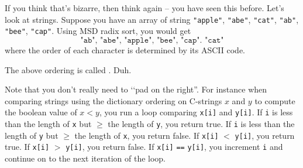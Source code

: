If you think that's bizarre, then think again -- you have
seen this before.
Let's look at strings.
Suppose you have an array of string
\verb!"apple"!,
\verb!"abe"!,
\verb!"cat"!,
\verb!"ab"!,
\verb!"bee"!,
\verb!"cap"!.
Using MSD radix sort, you would get
\[
\texttt{"ab",
"abe",
"apple",
"bee",
"cap".
"cat"}
\]
where the order of each character is determined by its ASCII code.

The above ordering is called . Duh.

Note that you  don't really need to \lq\lq pad on the right''.
For instance when comparing strings using the dictionary ordering
on C-strings $x$ and $y$ to compute the boolean value of
$x < y$,
you run a loop comparing \verb!x[i]! and \verb!y[i]!.
If \verb!i! is less than the length of \verb!x! but $\geq$ the length of
\verb!y!,
you return true.
If \verb!i! is less than the length of \verb!y! but $\geq$ the length of
\verb!x!,
you return false.
If \verb!x[i]! $<$ \verb!y[i]!, you return true.
If \verb!x[i]! $>$ \verb!y[i]!, you return false.
If \verb!x[i]! \verb!==! \verb!y[i]!, you increment \verb!i! and
continue on to the next iteration of the loop.
